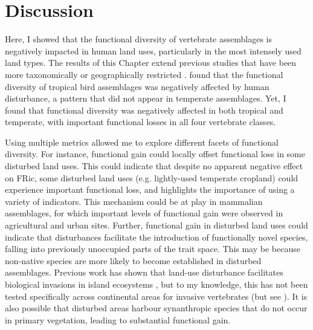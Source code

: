 \section{Discussion}
Here, I showed that the functional diversity of vertebrate assemblages is negatively impacted in human land uses, particularly in the most intensely used land types. The results of this Chapter extend previous studies that have been more taxonomically or geographically restricted \citep{Flynn2009, Matuoka2020}. \citet{Matuoka2020} found that the functional diversity of tropical bird assemblages was negatively affected by human disturbance, a pattern that did not appear in temperate assemblages. Yet, I found that functional diversity was negatively affected in both tropical and temperate, with important functional losses in all four vertebrate classes.

Using multiple metrics allowed me to explore different facets of functional diversity. For instance, functional gain could locally offset functional loss in some disturbed land uses. This could indicate that despite no apparent negative effect on FRic, some disturbed land uses (e.g. lightly-used temperate cropland) could experience important functional loss, and highlights the importance of using a variety of indicators. This mechanism could be at play in mammalian assemblages, for which important levels of functional gain were observed in agricultural and urban sites. Further, functional gain in disturbed land uses could indicate that disturbances facilitate the introduction of functionally novel species, falling into previously unoccupied parts of the trait space. This may be because non-native species are more likely to become established in disturbed assemblages. Previous work has shown that land-use disturbance facilitates biological invasions in island ecosystems \citep{Jesse2018,Sanchez-Ortiz2019}, but to my knowledge, this has not been tested specifically across continental areas for invasive vertebrates (but see \citet{Pysek2010}). It is also possible that disturbed areas harbour synanthropic species that do not occur in primary vegetation, leading to substantial functional gain.

